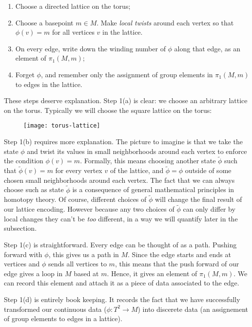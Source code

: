 \begin{enumerate}
\item Choose a directed lattice on the torus;
\item Choose a basepoint $m\in M$. Make \textit{local twists} around each vertex so that $\phi(v)=m$ for all vertices $v$ in the lattice.
\item On every edge, write down the winding number of $\phi$ along that edge, as an element of $\pi_1(M,m)$;
\item Forget $\phi$, and remember only the assignment of group elements in $\pi_1(M,m)$ to edges in the lattice.
\end{enumerate}

These steps deserve explanation. Step 1(a) is clear: we choose an arbitrary lattice on the torus. Typically we will choose the square lattice on the torus:

\begin{figure}[h]
\begin{center}
\texttt{[image: torus-lattice]}
\end{center}
\end{figure}

Step 1(b) requires more explanation. The picture to imagine is that we take the state $\phi$ and twist its values in small neighborhoods around each vertex to enforce the condition $\phi(v)=m$. Formally, this means choosing another state $\tilde{\phi}$ such that $\tilde{\phi}(v)=m$ for every vertex $v$ of the lattice, and $\tilde{\phi}=\phi$ outside of some chosen small neighborhoods around each vertex. The fact that we can always choose such as state $\tilde{\phi}$ is a consequence of general mathematical principles in homotopy theory. Of course, different choices of $\tilde{\phi}$ will change the final result of our lattice encoding. However because any two choices of $\tilde{\phi}$ can only differ by local changes they can't be \textit{too} different, in a way we will quantify later in the subsection.

Step 1(c) is straightforward. Every edge can be thought of as a path. Pushing forward with $\phi$, this gives us a path in $M$. Since the edge starts and ends at vertices and $\phi$ sends all vertices to $m$, this means that the push forward of our edge gives a loop in $M$ based at $m$. Hence, it gives an element of $\pi_1(M,m)$. We can record this element and attach it as a piece of data associated to the edge.

Step 1(d) is entirely book keeping. It records the fact that we have successfully transformed our continuous data ($\phi:T^2\to M$) into discerete data (an assignement of group elements to edges in a lattice).

